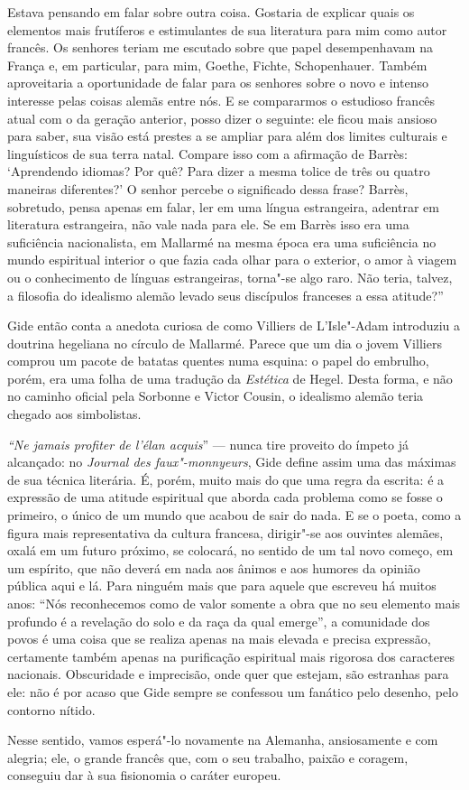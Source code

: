 Estava pensando em falar sobre outra coisa. Gostaria de explicar quais
os elementos mais frutíferos e estimulantes de sua literatura para mim
como autor francês. Os senhores teriam me escutado sobre que papel
desempenhavam na França e, em particular, para mim, Goethe, Fichte,
Schopenhauer. Também aproveitaria a oportunidade de falar para os
senhores sobre o novo e intenso interesse pelas coisas alemãs entre nós.
E se compararmos o estudioso francês atual com o da geração anterior,
posso dizer o seguinte: ele ficou mais ansioso para saber, sua visão
está prestes a se ampliar para além dos limites culturais e linguísticos
de sua terra natal. Compare isso com a afirmação de Barrès: `Aprendendo
idiomas? Por quê? Para dizer a mesma tolice de três ou quatro maneiras
diferentes?' O senhor percebe o significado dessa frase? Barrès,
sobretudo, pensa apenas em falar, ler em uma língua estrangeira,
adentrar em literatura estrangeira, não vale nada para ele. Se em Barrès
isso era uma suficiência nacionalista, em Mallarmé na mesma época era
uma suficiência no mundo espiritual interior o que fazia cada olhar para
o exterior, o amor à viagem ou o conhecimento de línguas estrangeiras,
torna"-se algo raro. Não teria, talvez, a filosofia do idealismo alemão
levado seus discípulos franceses a essa atitude?''

Gide então conta a anedota curiosa de como Villiers de L'Isle"-Adam
introduziu a doutrina hegeliana no círculo de Mallarmé. Parece que um
dia o jovem Villiers comprou um pacote de batatas quentes numa esquina:
o papel do embrulho, porém, era uma folha de uma tradução da
\emph{Estética} de Hegel. Desta forma, e não no caminho oficial pela
Sorbonne e Victor Cousin, o idealismo alemão teria chegado aos
simbolistas.

\emph{``Ne jamais profiter de l'élan acquis}'' --- nunca tire proveito do
ímpeto já alcançado: no \emph{Journal des faux"-monnyeurs}, Gide define
assim uma das máximas de sua técnica literária. É, porém, muito mais do
que uma regra da escrita: é a expressão de uma atitude espiritual que
aborda cada problema como se fosse o primeiro, o único de um mundo que
acabou de sair do nada. E se o poeta, como a figura mais representativa
da cultura francesa, dirigir"-se aos ouvintes alemães, oxalá em um futuro
próximo, se colocará, no sentido de um tal novo começo, em um espírito,
que não deverá em nada aos ânimos e aos humores da opinião pública aqui
e lá. Para ninguém mais que para aquele que escreveu há muitos anos:
``Nós reconhecemos como de valor somente a obra que no seu elemento mais
profundo é a revelação do solo e da raça da qual emerge'', a comunidade
dos povos é uma coisa que se realiza apenas na mais elevada e precisa
expressão, certamente também apenas na purificação espiritual mais
rigorosa dos caracteres nacionais. Obscuridade e imprecisão, onde quer
que estejam, são estranhas para ele: não é por acaso que Gide sempre se
confessou um fanático pelo desenho, pelo contorno nítido.

Nesse sentido, vamos esperá"-lo novamente na Alemanha, ansiosamente e com
alegria; ele, o grande francês que, com o seu trabalho, paixão e
coragem, conseguiu dar à sua fisionomia o caráter europeu.
